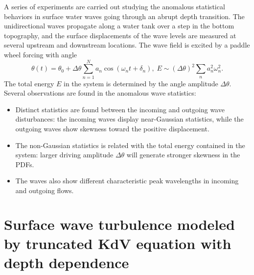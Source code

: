 \documentclass[9pt,twocolumn,twoside,lineno]{pnas-new}
\begin{document}
A series of experiments are carried out \cite{bolles2018anomalous}
studying the anomalous statistical behaviors in surface water waves
going through an abrupt depth transition. 
The unidirectional waves propagate along a water tank over a step in the bottom topography,
and the surface displacements of the wave levels are measured at several
upstream and downstream locations. The wave field is excited by a
paddle wheel forcing with angle
\[
\theta\left(t\right)=\theta_{0}+\Delta\theta\sum_{n=1}^{N}a_{n}\cos\left(\omega_{n}t+\delta_{n}\right),\;E\sim\left(\Delta\theta\right)^{2}\sum_{n}a_{n}^{2}\omega_{n}^{2}.
\]
The total energy $E$ in the system is determined by the angle amplitude
$\Delta\theta$. Several observations are found in the anomalous wave
statistics:
\begin{itemize}
\item Distinct statistics are found between the incoming and outgoing wave
disturbances: the incoming waves display near-Gaussian statistics,
while the outgoing waves show skewness toward the positive displacement.
\item The non-Gaussian statistics is related with the total energy contained
in the system: larger driving amplitude $\Delta\theta$ will generate
stronger skewness in the PDFs.
\item The waves also show different characteristic peak wavelengths in incoming
and outgoing flows.
\end{itemize}

\section{Surface wave turbulence modeled by truncated KdV equation with depth dependence\label{sec:Surface-wave-turbulence}}
\end{document}
